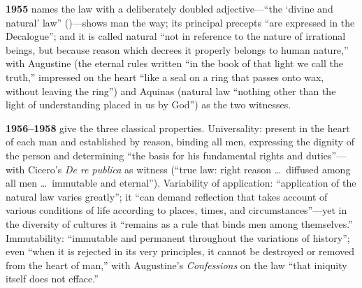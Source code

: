 \textbf{1955} names the law with a deliberately doubled adjective---``the `divine and natural' law'' ()---shows man the way; its principal precepts ``are expressed in the Decalogue''; and it is called natural ``not in reference to the nature of irrational beings, but because reason which decrees it properly belongs to human nature,'' with Augustine (the eternal rules written ``in the book of that light we call the truth,'' impressed on the heart ``like a seal on a ring that passes onto wax, without leaving the ring'') and Aquinas (natural law ``nothing other than the light of understanding placed in us by God'') as the two witnesses.

\textbf{1956--1958} give the three classical properties. Universality: present in the heart of each man and established by reason, binding all men, expressing the dignity of the person and determining ``the basis for his fundamental rights and duties''---with Cicero's \emph{De re publica} as witness (``true law: right reason \ldots\ diffused among all men \ldots\ immutable and eternal''). Variability of application: ``application of the natural law varies greatly''; it ``can demand reflection that takes account of various conditions of life according to places, times, and circumstances''---yet in the diversity of cultures it ``remains as a rule that binds men among themselves.'' Immutability: ``immutable and permanent throughout the variations of history''; even ``when it is rejected in its very principles, it cannot be destroyed or removed from the heart of man,'' with Augustine's \emph{Confessions} on the law ``that iniquity itself does not efface.''

